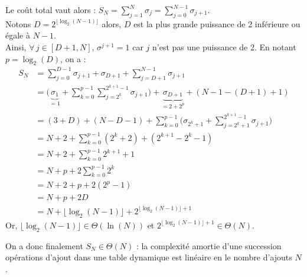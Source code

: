 		\eqskip{3mm}
		Le coût total vaut alors : \(S_N = \displaystyle\sum_{j=1}^N \sigma_j = \sum_{j=0}^{N-1} \sigma_{j+1}\). \\[1mm]
		Notons \(D = 2^{\lfloor \log_2(N-1) \rfloor}\) alors, \(D\) est la plus grande puissance de 2 inférieure ou égale à \(N-1\). \\
		Ainsi, \(\forall\,j \in [D+1,N]\), \(\sigma^{j+1} = 1\) car \(j\) n'est pas une puissance de 2. En notant \(p = \log_2(D)\), on a :
			\begin{align*}
				S_N & = \sum_{j=0}^{D-1} \sigma_{j+1} + \sigma_{D+1} + \sum_{j=D+1}^{N-1} \sigma_{j+1} \\
				& = \bigg(\underbrace{\sigma_1}_{=1} + \sum_{k=0}^{p-1} \sum_{j=2^k}^{2^{k+1}-1} \sigma_{j+1}\bigg) + \underbrace{\sigma_{D+1}}_{=2+2^p} + (N-1 - (D+1)+1) \\
				& = (3 + D) + (N - D - 1) + \sum_{k=0}^{p-1}\bigg(\sigma_{2^k+1} + \sum_{j=2^k+1}^{2^{k+1}-1}\sigma_{j+1}\bigg) \\
				& = N +2 + \sum_{k=0}^{p-1} (2^k + 2) + (2^{k+1} - 2^{k}-1) \\
				& = N +2 + \sum_{k=0}^{p-1} 2^{k+1} + 1 \\
				& = N + p + 2\sum_{k=0}^{p-1} 2^k \\
				& = N+2 + p + 2(2^{p} - 1) \\
				& = N + p + 2D \\
				& = N + \lfloor \log_2(N-1)\rfloor + 2^{\lfloor \log_2(N-1)\rfloor + 1}
			\end{align*}
		Or, \(\lfloor \log_2(N-1)\rfloor\in\Theta(\ln(N))\) et \(2^{\lfloor \log_2(N-1)\rfloor +1} \in \Theta(N)\).
		
		\begin{Propriete}
			On a donc finalement \(S_N \in \Theta(N)\) : la complexité amortie d'une succession opérations d'ajout dans une table dynamique est linéaire en le nombre d'ajouts \(N\).
		\end{Propriete}
	
